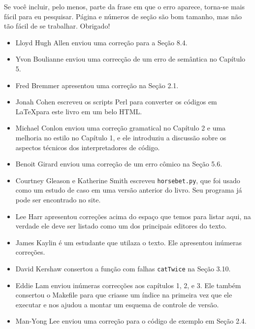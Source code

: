 \documentclass[10pt]{book}
\begin{document}
Se você incluir, pelo menos, parte da frase em que o
erro aparece, torna-se mais fácil para eu pesquisar. Página e
números de seção são bom tamanho, mas não tão fácil de se trabalhar.
Obrigado!

\begin {itemize}

\small
\item Lloyd Hugh Allen enviou uma correção para a Seção 8.4.

\item Yvon Boulianne enviou uma correcção de um erro de semântica no
Capítulo 5.

\item Fred Bremmer apresentou uma correção na Seção 2.1.

\item Jonah Cohen escreveu os scripts Perl para converter os
códigos em \LaTeX para este livro em um belo HTML.

\item Michael Conlon enviou uma correção gramatical no Capítulo 2
e uma melhoria no estilo no Capítulo 1, e ele introduziu a discussão
sobre os aspectos técnicos dos interpretadores de código.

\item Benoit Girard enviou uma
correção de um erro cômico na Seção 5.6.

\item Courtney Gleason e Katherine Smith escreveu {\tt horsebet.py},
que foi usado como um estudo de caso em uma versão anterior do livro. Seu
programa já pode ser encontrado no site.

\item Lee Harr apresentou correções acima do espaço que temos para listar
aqui, na verdade ele deve ser listado como um dos principais editores
do texto.

\item James Kaylin é um estudante que utilaza o texto. Ele apresentou
inúmeras correções.

\item David Kershaw consertou a função com falhas {\tt catTwice} na Seção
3.10.

\item Eddie Lam enviou inúmeras correcções aos capítulos 
1, 2, e 3.
Ele também consertou o Makefile para que criasse um índice na primeira vez que
ele executar e nos ajudou a montar um esquema de controle de versão.  

\item Man-Yong Lee enviou uma correção para o código de exemplo em
Seção 2.4.  


\end{itemize}
\end{document}
